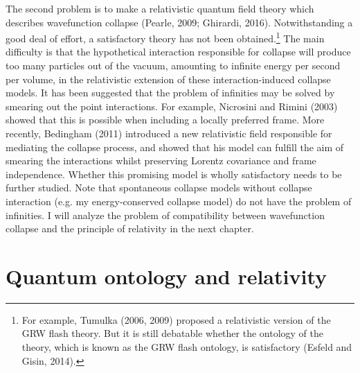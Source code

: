 The second problem is to make a relativistic quantum field theory which describes wavefunction collapse (Pearle, 2009; Ghirardi, 2016). Notwithstanding a good deal of effort, a satisfactory theory has not been obtained.\footnote{For example, Tumulka (2006, 2009) proposed a relativistic version of the GRW flash theory. But it is still debatable whether the ontology of the theory, which is known as the GRW flash ontology, is satisfactory (Esfeld and Gisin, 2014).} The main difficulty is that the hypothetical interaction responsible for collapse will produce too many particles out of the vacuum, amounting to infinite energy per second per volume, in the relativistic extension of these interaction-induced collapse models.
It has been suggested that the problem of infinities may be solved by smearing out the point interactions. For example, Nicrosini and Rimini (2003) showed that this is possible when including a locally preferred frame. More recently, Bedingham (2011) introduced a new relativistic field responsible for mediating the collapse process, and showed that his model can fulfill the aim of smearing the interactions whilst preserving Lorentz covariance and frame independence. Whether this promising model is wholly satisfactory needs to be further studied.
Note that spontaneous collapse models without collapse interaction (e.g. my energy-conserved collapse model) do not have the problem of infinities. I will analyze the problem of compatibility between wavefunction collapse and the principle of relativity in the next chapter.



\chapter{Quantum ontology and relativity}


